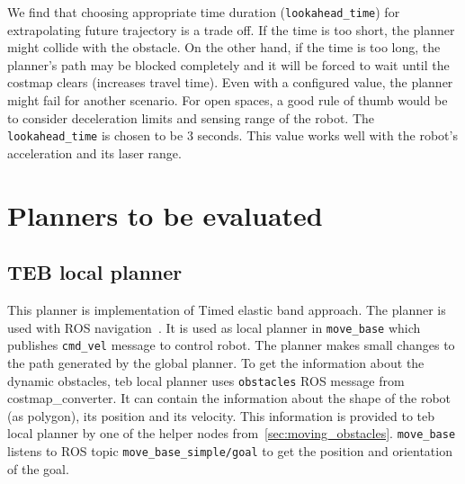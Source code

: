     We find that choosing appropriate time duration (\texttt{lookahead\_time}) for extrapolating future trajectory is a trade
    off. If the time is too short, the planner might collide with the obstacle. On the other
    hand, if the time is too long, the planner's path may be blocked completely and it will be forced
    to wait until the costmap clears (increases travel time). Even with a
    configured value, the planner might fail for another scenario. For open spaces, a good rule of
    thumb would be to consider deceleration limits and sensing range of the robot. The \texttt{lookahead\_time} 
    is chosen to be 3 seconds. This value works well with the robot's acceleration and its laser range.


\section{Planners to be evaluated}%
\label{sec:planners_to_be_evaluated}

\subsection{TEB local planner}%
\label{sub:teb_local_planner}
This planner\cite{tebLocalPlanner} is implementation of Timed elastic band 
approach\cite{rosmann2015planning}.
The planner is used with ROS navigation~\cite{rosnavigation}. It is used as local
planner in \texttt{move\_base} which publishes \texttt{cmd\_vel} message to control robot. 
The planner makes small changes to the path generated by the global planner.
To get the information about the dynamic obstacles, teb local planner uses \texttt{obstacles} 
ROS message from costmap\_converter\cite{costmapconverter}. It can contain the information about 
the shape of the robot (as polygon), its position and its velocity. This information is provided 
to teb local planner by one of the helper nodes from~\ref{sec:moving_obstacles}.
\texttt{move\_base} listens to ROS topic \texttt{move\_base\_simple/goal} to get the position
and orientation of the goal.

